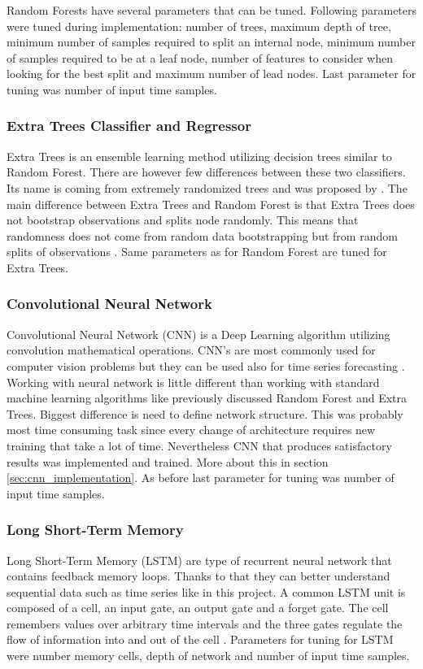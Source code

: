 \documentclass{article}
\begin{document}
Random Forests have several parameters that can be tuned. Following parameters were tuned during implementation: number of trees, maximum depth of tree, minimum number of samples required to split an internal node, minimum number of samples required to be at a leaf node, number of features to consider when looking for the best split and maximum number of lead nodes. Last parameter for tuning was number of input time samples.

\subsubsection{Extra Trees Classifier and Regressor}
Extra Trees is an ensemble learning method utilizing decision trees similar to Random Forest. There are however few differences between these two classifiers. Its name is coming from extremely randomized trees and was proposed by \citep{geurts206extratree}. The main difference between Extra Trees and Random Forest is that Extra Trees does not bootstrap observations and splits node randomly. This means that randomness does not come from random data bootstrapping but from random splits of observations \citep{bhandari2019extratree}. Same parameters as for Random Forest are tuned for Extra Trees.

\subsubsection{Convolutional Neural Network}
Convolutional Neural Network (CNN) is a Deep Learning algorithm utilizing convolution mathematical operations. CNN's are most commonly used for computer vision problems but they can be used also for time series forecasting \citep{brownlee2019cnn} \citep{granat2020cnn}. Working with neural network is little different than working with standard machine learning algorithms like previously discussed Random Forest and Extra Trees. Biggest difference is need to define network structure. This was probably most time consuming task since every change of architecture requires new training that take a lot of time. Nevertheless CNN that produces satisfactory results was implemented and trained. More about this in section \ref{sec:cnn_implementation}. As before last parameter for tuning was number of input time samples.

\subsubsection{Long Short-Term Memory}
Long Short-Term Memory (LSTM) are type of recurrent neural network that contains feedback memory loops. Thanks to that they can better understand sequential data such as time series like in this project. A common LSTM unit is composed of a cell, an input gate, an output gate and a forget gate. The cell remembers values over arbitrary time intervals and the three gates regulate the flow of information into and out of the cell \citep{wiki2020lstm}. Parameters for tuning for LSTM were number memory cells, depth of network and number of input time samples.
\end{document}
